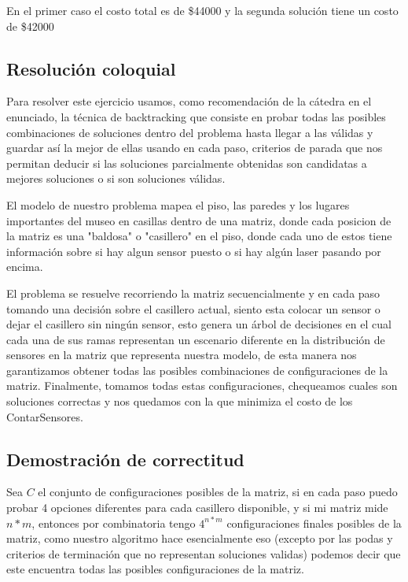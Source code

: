 En el primer caso el costo total es de \$44000 y la segunda solución tiene un costo de \$42000

\subsection{Resolución coloquial}

Para resolver este ejercicio usamos, como recomendación de la cátedra en el enunciado, la técnica de backtracking que consiste en probar todas las posibles combinaciones de soluciones dentro del problema hasta llegar a las válidas y guardar así la mejor de ellas usando en cada paso, criterios de parada que nos permitan deducir si las soluciones parcialmente obtenidas son candidatas a mejores soluciones o si son soluciones válidas.

El modelo de nuestro problema mapea el piso, las paredes y los lugares importantes del museo en casillas dentro de una matriz, donde cada posicion de la matriz es una "baldosa" o "casillero" en el piso, donde cada uno de estos tiene información sobre si hay algun sensor puesto o si hay algún laser pasando por encima.

El problema se resuelve recorriendo la matriz secuencialmente y en cada paso tomando una decisión sobre el casillero actual, siento esta colocar un sensor o dejar el casillero sin ningún sensor, esto genera un árbol de decisiones en el cual cada una de sus ramas representan un escenario diferente en la distribución de sensores en la matriz que representa nuestra modelo, de esta manera nos garantizamos obtener todas las posibles combinaciones de configuraciones de la matriz. Finalmente, tomamos todas estas configuraciones, chequeamos cuales son soluciones correctas y nos quedamos con la que minimiza el costo de los ContarSensores.

\subsection{Demostración de correctitud}

Sea $C$ el conjunto de configuraciones posibles de la matriz, si en cada paso puedo probar 4 opciones diferentes para cada casillero disponible, y si mi matriz mide $n*m$, entonces por combinatoria tengo $4^{n*m}$ configuraciones finales posibles de la matriz, como nuestro algoritmo hace esencialmente eso (excepto por las podas y criterios de terminación que no representan soluciones validas) podemos decir que este encuentra todas las posibles configuraciones de la matriz.

